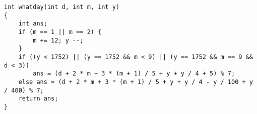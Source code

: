 \begin{lstlisting}
int whatday(int d, int m, int y)
{
	int ans;
	if (m == 1 || m == 2) {
		m += 12; y --;
	}
	if ((y < 1752) || (y == 1752 && m < 9) || (y == 1752 && m == 9 && d < 3))
		ans = (d + 2 * m + 3 * (m + 1) / 5 + y + y / 4 + 5) % 7;
	else ans = (d + 2 * m + 3 * (m + 1) / 5 + y + y / 4 - y / 100 + y / 400) % 7;
	return ans;
}
\end{lstlisting}
